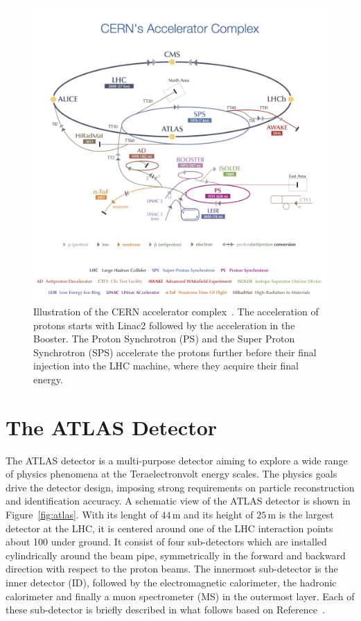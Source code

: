 \begin{figure}[tp]
     \begin{center}

            \includegraphics[width=\textwidth]{figure/LHC2.jpg}

    \end{center}
    \caption{Illustration of the CERN accelerator complex~\cite{lhcImage}. The acceleration of protons starts with Linac2 followed by the
	acceleration in the Booster. The Proton Synchrotron (PS) and the Super Proton Synchrotron (SPS) accelerate the protons further  before
	their final injection into the LHC  machine, where they acquire their final energy.}


   \label{fig:LHC}
\end{figure}


\section{The ATLAS Detector}\label{sec:atlas}
The ATLAS detector is a multi-purpose detector aiming to explore a wide range of physics 
phenomena at the Teraelectronvolt energy scales.
The physics goals drive the detector design, imposing strong requirements on particle reconstruction and 
 identification accuracy.
A schematic view of the ATLAS detector is shown in Figure~\ref{fig:atlas}. 
With its lenght of $44\,$m and its height of $25\,$m  is the largest detector at the LHC, it is centered around one of the LHC interaction points about
100 under ground. It consist of four sub-detectors which are installed  cylindrically around the
beam pipe, symmetrically in the forward and backward direction with respect to the proton beams.
The innermost sub-detector is the inner detector (ID), followed by the electromagnetic calorimeter, the hadronic calorimeter and finally
a muon spectrometer (MS) in the outermost layer. Each of these sub-detector is briefly described in what follows based on  Reference~\cite{ATLASDetector}.


